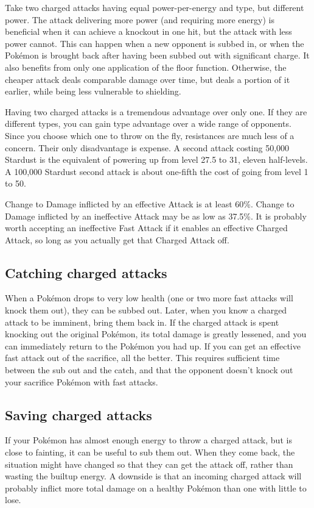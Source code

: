 Take two charged attacks having equal power-per-energy and type, but different power.
The attack delivering more power (and requiring more energy) is beneficial
 when it can achieve a knockout in one hit, but the attack with less power cannot.
This can happen when a new opponent is subbed in, or when the Pokémon is brought back
 after having been subbed out with significant charge.
It also benefits from only one application of the floor function.
Otherwise, the cheaper attack deals comparable damage over time, but deals a portion
 of it earlier, while being less vulnerable to shielding.

Having two charged attacks is a tremendous advantage over only one.
If they are different types, you can gain type advantage over a wide range of opponents.
Since you choose which one to throw on the fly, resistances are much less of a concern.
Their only disadvantage is expense.
A second attack costing 50,000 Stardust is the equivalent of powering up from level 27.5 to 31,
 eleven half-levels.
A 100,000 Stardust second attack is about one-fifth the cost of going from level 1 to 50.

Change to Damage inflicted by an effective Attack is at least 60\%.
Change to Damage inflicted by an ineffective Attack may be as
 low as 37.5\%.
It is probably worth accepting an ineffective Fast Attack if it
 enables an effective Charged Attack, so long as you actually
 get that Charged Attack off.

\subsection{Catching charged attacks}
When a Pokémon drops to very low health (one or two more fast attacks will knock
 them out), they can be subbed out.
Later, when you know a charged attack to be imminent, bring them back in.
If the charged attack is spent knocking out the original Pokémon, its total
 damage is greatly lessened, and you can immediately return to the Pokémon
 you had up.
If you can get an effective fast attack out of the sacrifice, all the better.
This requires sufficient time between the sub out and the catch, and that the
 opponent doesn't knock out your sacrifice Pokémon with fast attacks.

\subsection{Saving charged attacks}
If your Pokémon has almost enough energy to throw a charged attack, but is close to fainting, it can be useful to sub them out.
When they come back, the situation might have changed so that they can get the attack off,
 rather than wasting the builtup energy.
A downside is that an incoming charged attack will probably inflict more total
 damage on a healthy Pokémon than one with little \HP{} to lose.

